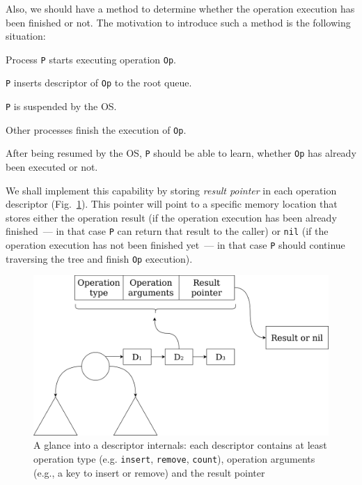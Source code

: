 \documentclass[times, dvipsnames,%
               languages={russian,english} %
              ]{itmo-student-thesis}
\begin{document}
Also, we should have a method to determine whether the operation execution has been finished or not. The motivation to introduce such a method is the following situation:

\begin{nenum}
    \item Process \texttt{P} starts executing operation \texttt{Op}.
    
    \item \texttt{P} inserts descriptor of \texttt{Op} to the root queue.
    
    \item \texttt{P} is suspended by the OS.
    
    \item Other processes finish the execution of \texttt{Op}.
    
    \item After being resumed by the OS, \texttt{P} should be able to learn, whether \texttt{Op} has already been executed or not.
\end{nenum}

\bigbreak

We shall implement this capability by storing \emph{result pointer} in each operation descriptor (Fig.~\ref{descriptor-internals-pic}). This pointer will point to a specific memory location that stores either the operation result (if the operation execution has been already finished~--- in that case \texttt{P} can return that result to the caller) or \texttt{nil} (if the operation execution has not been finished yet~--- in that case \texttt{P} should continue traversing the tree and finish \texttt{Op} execution).

\begin{figure}[H]
  \centering
  \caption{A glance into a descriptor internals: each descriptor contains at least operation type (e.g. \texttt{insert}, \texttt{remove}, \texttt{count}), operation arguments (e.g., a key to insert or remove) and the result pointer}
  \label{descriptor-internals-pic}
  \includegraphics[width=\linewidth]{pics/descriptor-internals.png}
\end{figure}
\end{document}
